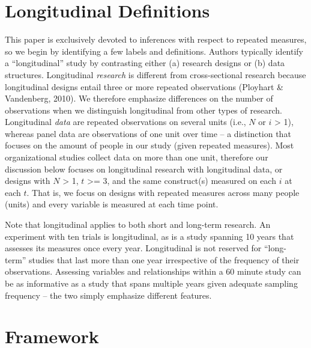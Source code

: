 \documentclass[english,,man]{apa6}
\theoremstyle{definition}
\theoremstyle{definition}
\theoremstyle{definition}
\theoremstyle{remark}
\begin{document}
\hypertarget{longitudinal-definitions}{%
\section{Longitudinal Definitions}\label{longitudinal-definitions}}

This paper is exclusively devoted to inferences with respect to repeated
measures, so we begin by identifying a few labels and definitions.
Authors typically identify a \enquote{longitudinal} study by contrasting
either (a) research designs or (b) data structures. Longitudinal
\emph{research} is different from cross-sectional research because
longitudinal designs entail three or more repeated observations
(Ployhart \& Vandenberg, 2010). We therefore emphasize differences on
the number of observations when we distinguish longitudinal from other
types of research. Longitudinal \emph{data} are repeated observations on
several units (i.e., \(N\) or \(i\) \textgreater{} 1), whereas panel
data are observations of one unit over time -- a distinction that
focuses on the amount of people in our study (given repeated measures).
Most organizational studies collect data on more than one unit,
therefore our discussion below focuses on longitudinal research with
longitudinal data, or designs with \(N\) \textgreater{} 1, \(t\)
\textgreater{}= 3, and the same construct(s) measured on each \(i\) at
each \(t\). That is, we focus on designs with repeated measures across
many people (units) and every variable is measured at each time point.

Note that longitudinal applies to both short and long-term research. An
experiment with ten trials is longitudinal, as is a study spanning 10
years that assesses its measures once every year. Longitudinal is not
reserved for \enquote{long-term} studies that last more than one year
irrespective of the frequency of their observations. Assessing variables
and relationships within a 60 minute study can be as informative as a
study that spans multiple years given adequate sampling frequency -- the
two simply emphasize different features.

\hypertarget{framework}{%
\section{Framework}\label{framework}}
\end{document}
